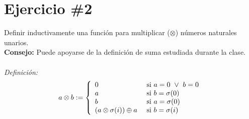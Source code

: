 \documentclass[11pt,letterpaper]{article}
\begin{document}
\section*{Ejercicio \#2}
\noindent Definir inductivamente una función para multiplicar ($\otimes$) números naturales unarios. \\
{\bf Consejo: }Puede apoyarse de la definición de suma estudiada durante la clase.
\\
\\
\emph{Definición:}
\[
	a\otimes b := \left\{
    \begin{array}{l l}
    	0 & \ \mbox{si } a=0 \ \lor \ b=0 \\
    	a & \ \mbox{si } b=\sigma(0) \\
        b & \ \mbox{si } a=\sigma(0) \\
        (a \otimes \sigma(i)) \oplus a & \ \mbox{si } b=\sigma(i) \\
	\end{array}
    \right.
\]
\end{document}
